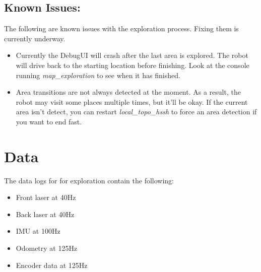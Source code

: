 \documentclass{article}
\begin{document}
\subsection{Known Issues:}

The following are known issues with the exploration process. Fixing them is currently underway.

\begin{itemize}
  \item Currently the DebugUI will crash after the last area is explored. The robot will drive back to the starting 
location before finishing. Look at the console running \emph{map\_exploration} to see when it has finished.
  \item Area transitions are not always detected at the moment. As a result, the robot may visit some places multiple 
times, but it'll be okay. If the current area isn't detect, you can restart \emph{local\_topo\_hssh} to force an area 
detection if you want to end fast.
\end{itemize}


\section{Data}

The data logs for for exploration contain the following:

\begin{itemize}
 \item Front laser at 40Hz
 \item Back laser at 40Hz
 \item IMU at 100Hz
 \item Odometry at 125Hz
 \item Encoder data at 125Hz
\end{itemize}
\end{document}
